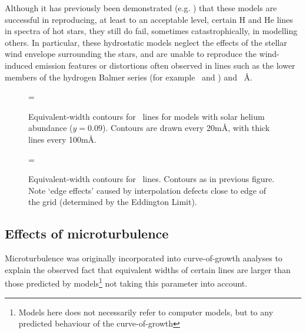 Although it has previously been demonstrated (e.g. \cite{sm:94}) that
these models are successful in reproducing, at least to an acceptable
level, certain H and He lines in spectra of hot stars, they still do
fail, sometimes catastrophically, in modelling others. In particular,
these hydrostatic models neglect the effects of the stellar wind
envelope surrounding the stars, and are unable to reproduce the
wind-induced emission features or distortions often observed in lines
such as the lower members of the hydrogen Balmer series (for example
\ha\ and \hb) and \heii~\AA.

\begin{figure} %
\epsfxsize=\figwidth
\setlength{\cen}{(\textwidth / 2) - (\epsfxsize / 2)}
\hspace{\cen}
\caption[Equivalent-width contours for \hei]
{\fcfont Equivalent-width contours for \hei\ lines for models with
solar helium abundance ($y = 0.09$). Contours are drawn every 20m\AA,
with thick lines every 100m\AA.  
}
\label{fig:cont:he1}
\end{figure}   %

\begin{figure} %
\epsfxsize=\figwidth
\setlength{\cen}{(\textwidth / 2) - (\epsfxsize / 2)}
\hspace{\cen}
\caption[Equivalent-width contours for \heii]
{\fcfont Equivalent-width contours for \heii\ lines. Contours as in
previous figure. Note `edge effects' caused by interpolation defects
close to edge of the grid (determined by the Eddington Limit). 
}
\label{fig:cont:he2}
\end{figure}   %


\subsection{Effects of microturbulence}

Microturbulence was originally incorporated into curve-of-growth
analyses to explain the observed fact that equivalent widths of
certain lines are larger than those predicted by
models\footnote{Models here does not necessarily refer to computer
models, but to any predicted behaviour of the curve-of-growth} not
taking this parameter into account.

